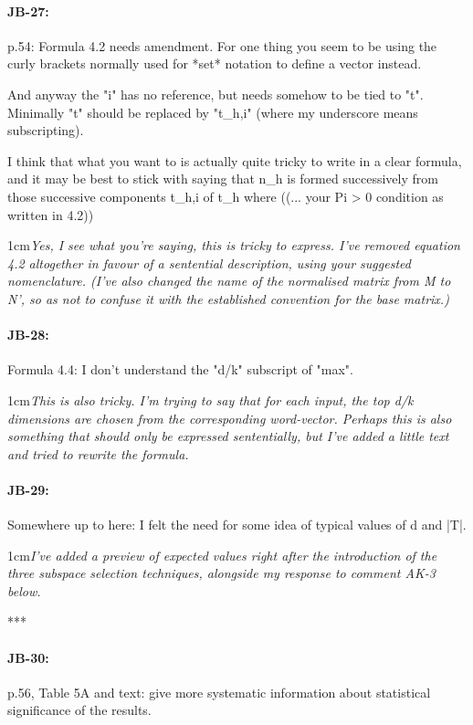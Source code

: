 \documentclass[11pt,a4paper]{article}
\newcommand{\res}[1]{\vspace{0.25cm} \begin{adjustwidth}{1cm}{}\emph{#1}\end{adjustwidth}}
\begin{document}
\paragraph{JB-27:} p.54: Formula 4.2 needs amendment. For one thing you seem to be using the curly brackets normally used for *set* notation to define a vector instead.

And anyway the "i" has no reference, but needs somehow to be tied to "t". Minimally "t" should be replaced by "t\_h,i" (where my underscore means subscripting).

I think that what you want to is actually quite tricky to write in a clear formula, and it may be best to stick with saying that n\_h is formed successively from those successive components t\_h,i of t\_h where ((... your Pi > 0 condition as written in 4.2))

\res{Yes, I see what you're saying, this is tricky to express.  I've removed equation 4.2 altogether in favour of a sentential description, using your suggested nomenclature.  (I've also changed the name of the normalised matrix from M to N', so as not to confuse it with the established convention for the base matrix.)}

\paragraph{JB-28:} Formula 4.4: I don't understand the "d/k" subscript of "max".

\res{This is also tricky.  I'm trying to say that for each input, the top d/k dimensions are chosen from the corresponding word-vector.  Perhaps this is also something that should only be expressed sententially, but I've added a little text and tried to rewrite the formula.}

\paragraph{JB-29:} Somewhere up to here: I felt the need for some idea of typical values of d and |T|.

\res{I've added a preview of expected values right after the introduction of the three subspace selection techniques, alongside my response to comment AK-3 below.}

***\paragraph{JB-30:} p.56, Table 5A and text: give more systematic information about statistical significance of the results.
\end{document}
